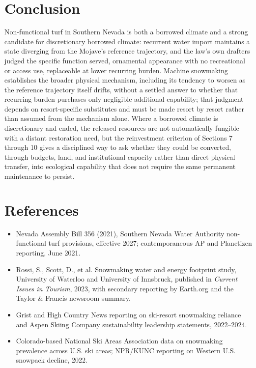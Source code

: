 \documentclass[11pt]{article}
\begin{document}
\section{Conclusion}

Non-functional turf in Southern Nevada is both a borrowed climate and a strong candidate for discretionary borrowed climate: recurrent water import maintains a state diverging from the Mojave's reference trajectory, and the law's own drafters judged the specific function served, ornamental appearance with no recreational or access use, replaceable at lower recurring burden. Machine snowmaking establishes the broader physical mechanism, including its tendency to worsen as the reference trajectory itself drifts, without a settled answer to whether that recurring burden purchases only negligible additional capability; that judgment depends on resort-specific substitutes and must be made resort by resort rather than assumed from the mechanism alone. Where a borrowed climate is discretionary and ended, the released resources are not automatically fungible with a distant restoration need, but the reinvestment criterion of Sections 7 through 10 gives a disciplined way to ask whether they could be converted, through budgets, land, and institutional capacity rather than direct physical transfer, into ecological capability that does not require the same permanent maintenance to persist.

\section*{References}
\begin{itemize}[nosep]
\item Nevada Assembly Bill 356 (2021), Southern Nevada Water Authority non-functional turf provisions, effective 2027; contemporaneous AP and Planetizen reporting, June 2021.
\item Rossi, S., Scott, D., et al. Snowmaking water and energy footprint study, University of Waterloo and University of Innsbruck, published in \emph{Current Issues in Tourism}, 2023, with secondary reporting by Earth.org and the Taylor \& Francis newsroom summary.
\item Grist and High Country News reporting on ski-resort snowmaking reliance and Aspen Skiing Company sustainability leadership statements, 2022--2024.
\item Colorado-based National Ski Areas Association data on snowmaking prevalence across U.S. ski areas; NPR/KUNC reporting on Western U.S. snowpack decline, 2022.
\end{itemize}
\end{document}
